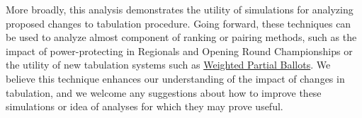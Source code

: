 \documentclass{tufte-handout}
\begin{document}
More broadly, this analysis demonstrates the utility of simulations for analyzing proposed changes to tabulation procedure. Going forward, these techniques can be used to analyze almost component of ranking or pairing methods, such as the impact of power-protecting in Regionals and Opening Round Championships or the utility of new tabulation systems such as \href{http://anniejw.com/WPB/}{Weighted Partial Ballots}. We believe this technique enhances our understanding of the impact of changes in tabulation, and we welcome any suggestions about how to improve these simulations or idea of analyses for which they may prove useful.
\end{document}
